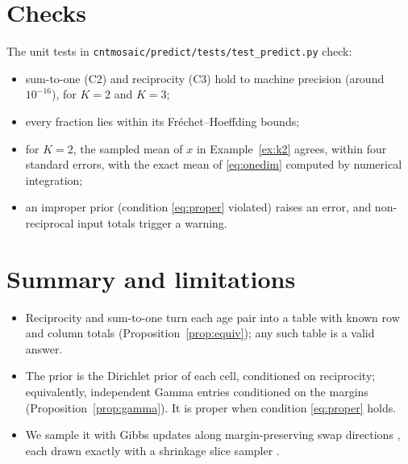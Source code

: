 \documentclass[11pt,a4paper]{article}
\theoremstyle{definition}
\theoremstyle{remark}
\begin{document}
\section{Checks}
\label{sec:checks}

The unit tests in \texttt{cntmosaic/predict/tests/test\_predict.py} check:
\begin{itemize}
  \item sum-to-one (C2) and reciprocity (C3) hold to machine precision
        (around $10^{-16}$), for $K=2$ and $K=3$;
  \item every fraction lies within its Fr\'echet--Hoeffding bounds;
  \item for $K=2$, the sampled mean of $x$ in Example~\ref{ex:k2} agrees,
        within four standard errors, with the exact mean of \eqref{eq:onedim}
        computed by numerical integration;
  \item an improper prior (condition \eqref{eq:proper} violated) raises an
        error, and non-reciprocal input totals trigger a warning.
\end{itemize}

\section{Summary and limitations}
\label{sec:summary}

\begin{itemize}
  \item Reciprocity and sum-to-one turn each age pair into a table with known
        row and column totals (Proposition~\ref{prop:equiv}); any such table is
        a valid answer.
  \item The prior is the Dirichlet prior of each cell, conditioned on
        reciprocity; equivalently, independent Gamma entries conditioned on
        the margins (Proposition~\ref{prop:gamma}). It is proper when
        condition \eqref{eq:proper} holds.
  \item We sample it with Gibbs updates along margin-preserving swap
        directions \citep{diaconis1998algebraic}, each drawn exactly with a
        shrinkage slice sampler \citep{neal2003slice}.
\end{itemize}
\end{document}
